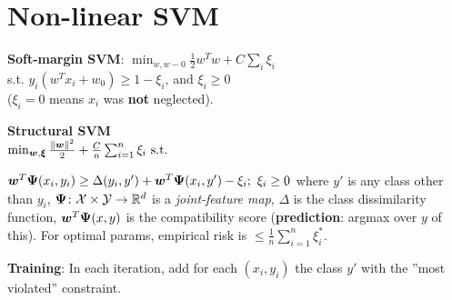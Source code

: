 \section{Non-linear SVM}
\textbf{Soft-margin SVM}:
$\min_{w, w-0} \frac{1}{2} w^T w + C \sum_i \xi_i$\\
s.t. $y_i(w^Tx_i+w_0) \geq 1-\xi_i$, and $\xi_i\geq0$\\
($\xi_i=0$ means $x_i$ was \textbf{not} neglected).

\textbf{Structural SVM}\\
$
\min_{\boldsymbol{w}, \boldsymbol{\xi}} \frac{\left\lVert\boldsymbol{w}\right\rVert^2}{2}
+ \frac{C}{n} \sum_{i=1}^n \xi_i
 \text{ s.t. } $
 
$
\boldsymbol{w}^T \boldsymbol{\Psi}(x_i, y_i) \geq \Delta(y_i, y') + \boldsymbol{w}^T \boldsymbol{\Psi}(x_i, y') -\xi_i;
\ \xi_i \geq 0
$
%
where $y'$ is any class other than $y_i$,
$\boldsymbol{\Psi} \colon \mathcal{X} \times \mathcal{Y} \rightarrow \mathbb R^d$ is a \textit{joint-feature map},
$\Delta$ is the class dissimilarity function,
$\boldsymbol{w}^T\boldsymbol{\Psi}(x, y)$ is the compatibility score (\textbf{prediction}: argmax over $y$ of this).
For optimal params, empirical risk is $\leq \frac{1}{n} \sum_{i=1}^n \xi^*_i$.

\textbf{Training}: In each iteration, add for each $(x_i, y_i)$ the class $y'$ with the ''most violated'' constraint.